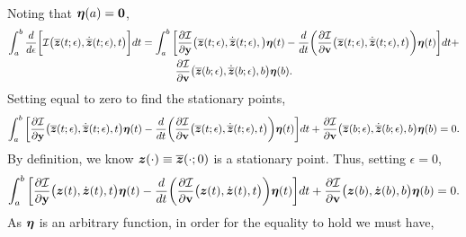 \documentclass[3p,computermodern,10pt]{elsarticle}
\begin{document}
\begin{appendices}
\begin{multline*}
\end{multline*}
Noting that $\boldsymbol \eta(a) = \boldsymbol 0$,
\begin{multline*}
\int_a^b \frac{d}{d\epsilon}\bigg[ \mathcal{I} \big(\overline{\boldsymbol z}(t;\epsilon),\dot{\overline{\boldsymbol z}}(t;\epsilon),t \big) \bigg] dt =  \int_a^b  \bigg[\frac{\partial \mathcal{I}  }{\partial \mathbf{y} } \big(\overline{\boldsymbol z}(t;\epsilon),\dot{\overline{\boldsymbol z}}(t;\epsilon) , \big) \boldsymbol \eta(t) - \frac{d}{dt}\bigg( \frac{\partial \mathcal{I}}{\partial \mathbf{{v}} }  \big(\overline{\boldsymbol z}(t;\epsilon),\dot{\overline{\boldsymbol z}}(t;\epsilon) ,t \big) \bigg) \boldsymbol \eta(t) \bigg]dt + \\ \frac{\partial \mathcal{I}}{\partial \mathbf{{v}}} \big(\overline{\boldsymbol z}(b;\epsilon),\dot{\overline{\boldsymbol z}}(b;\epsilon) ,b \big) \boldsymbol \eta(b) . 
\end{multline*}
Setting equal to zero to find the stationary points,
$$
  \int_a^b  \bigg[\frac{\partial \mathcal{I}  }{\partial \mathbf{y} } \big(\overline{\boldsymbol z}(t;\epsilon),\dot{\overline{\boldsymbol z}}(t;\epsilon),t \big) \boldsymbol \eta(t) - \frac{d}{dt}\bigg( \frac{\partial \mathcal{I}}{\partial \mathbf{{v}} }  \big(\overline{\boldsymbol z}(t;\epsilon),\dot{\overline{\boldsymbol z}}(t;\epsilon),t \big) \bigg) \boldsymbol \eta(t) \bigg]dt + \frac{\partial \mathcal{I}}{\partial \mathbf{{v}}} \big(\overline{\boldsymbol z}(b;\epsilon),\dot{\overline{\boldsymbol z}}(b;\epsilon),b \big) \boldsymbol \eta(b)  = 0. 
$$
By definition, we know $\boldsymbol z(\cdot) \equiv \overline{\boldsymbol z}(\cdot;0)$ is a stationary point. Thus, setting $\epsilon = 0$,
 $$
  \int_a^b  \bigg[\frac{\partial \mathcal{I}  }{\partial \mathbf{y} } \big(\boldsymbol z(t),\dot{\boldsymbol z}(t),t \big) \boldsymbol \eta(t) - \frac{d}{dt}\bigg( \frac{\partial \mathcal{I}}{\partial \mathbf{{v}} }  \big(\boldsymbol z(t),\dot{\boldsymbol z}(t),t \big) \bigg) \boldsymbol \eta(t) \bigg]dt + \frac{\partial \mathcal{I}}{\partial \mathbf{{v}}} \big(\boldsymbol z(b),\dot{\boldsymbol z}(b) ,b\big) \boldsymbol \eta(b)  = 0. 
$$
As $\boldsymbol \eta$ is an arbitrary function, in order for the equality to hold we must have,

\end{appendices}
\end{document}
